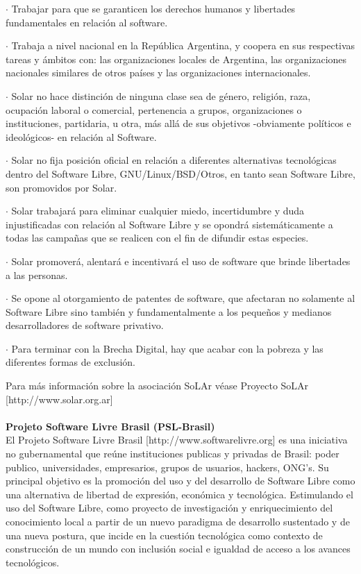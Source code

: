 \documentclass{book}
\begin{document}
\begin{description}
\item $\cdot$ Trabajar para que se garanticen los derechos humanos y libertades fundamentales en relación al software.
\item $\cdot$ Trabaja a nivel nacional en la República Argentina, y coopera en sus respectivas tareas y ámbitos con: las organizaciones locales de Argentina, las organizaciones nacionales similares de otros países y las organizaciones internacionales.
\item $\cdot$ Solar no hace distinción de ninguna clase sea de género, religión, raza, ocupación laboral o comercial, pertenencia a grupos, organizaciones o instituciones, partidaria, u otra, más allá de sus objetivos -obviamente políticos e ideológicos- en relación al Software.
\item $\cdot$ Solar no fija posición oficial en relación a diferentes alternativas tecnológicas dentro del Software Libre, GNU/Linux/BSD/Otros, en tanto sean Software Libre, son promovidos por Solar.
\item $\cdot$ Solar trabajará para eliminar cualquier miedo, incertidumbre y duda injustificadas con relación al Software Libre y se opondrá sistemáticamente a todas las campañas que se realicen con el fin de difundir estas especies.
\item $\cdot$ Solar promoverá, alentará e incentivará el uso de software que brinde libertades a las personas.
\item $\cdot$ Se opone al otorgamiento de patentes de software, que afectaran no solamente al Software Libre sino también y fundamentalmente a los pequeños y medianos desarrolladores de software privativo.
\item $\cdot$ Para terminar con la Brecha Digital, hay que acabar con la pobreza y las diferentes formas de exclusión.
\end{description}
Para más información sobre la asociación SoLAr véase Proyecto SoLAr [http://www.solar.org.ar]
\\
\\
{\bf Projeto Software Livre Brasil (PSL-Brasil)}
\\
El Projeto Software Livre Brasil [http://www.softwarelivre.org] es una iniciativa no gubernamental que reúne instituciones publicas y privadas de Brasil: poder publico, universidades, empresarios, grupos de usuarios, hackers, ONG's. Su principal objetivo es la promoción del uso y del desarrollo de Software Libre como una alternativa de libertad de expresión, económica y tecnológica. Estimulando el uso del Software Libre, como proyecto de investigación y enriquecimiento del conocimiento local a partir de un nuevo paradigma de desarrollo sustentado y de una nueva postura, que incide en la cuestión tecnológica como contexto de construcción de un mundo con inclusión social e igualdad de acceso a los avances tecnológicos.
\end{document}

